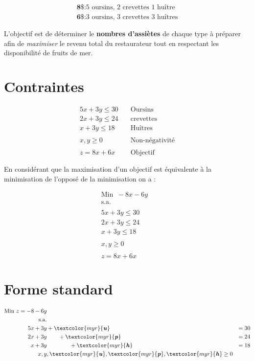 \documentclass{report}
\begin{document}
\begin{multicols*}{3}
\begin{align*}
    \textbf{8\$} \colon \text{5 oursins, 2 crevettes 1 huître}  \\
    \textbf{6\$} \colon \text{3 oursins, 3 crevettes 3 huîtres}   
\end{align*}

L'objectif est de déterminer le \textbf{nombres d'assiètes} de chaque 
type à préparer afin de \textit{maximiser} 
le revenu total du restaurateur tout en 
respectant les disponibilité de fruits de mer. 


\section{Contraintes}
\begin{align*}
    5x + 3y \leq 30& \quad \text{Oursins} \\
    2x + 3y \leq 24& \quad \text{crevettes} \\ 
    x  + 3y \leq 18& \quad \text{Huîtres}
    \\
    \\ 
    x, y \geq 0& \quad \text{Non-négativité}
    \\ 
    \\
    z = 8x + 6x& \quad \text{Objectif}
\end{align*}




En considérant que la maximisation d'un objectif est 
équivalente à la minimisation de l'opposé de la minimisation on a :


\begin{align*}
    \text{Min} \;\; -8x  -6y& \\
    \text{s.a.}
    \\
    \\
    5x + 3y \leq 30& \\
    2x + 3y \leq 24& \\
    x  + 3y \leq 18& 
    \\
    \\ 
    x, y \geq 0& 
    \\ 
    \\
    z = 8x + 6x& 
\end{align*}


\section{Forme standard}

\begin{align*}
    \text{Min } z = -8 -6y \\ 
    \text{s.a.} 
    \\
    5x + 3y& + \textcolor{myr}{\textbf{\textit{u}}}   &= 30 \\
    2x + 3y& \quad\quad + \textcolor{myr}{\textbf{\textit{p}}}   &= 24\\
     x + 3y& \quad\quad\quad\quad + \textcolor{myr}{\textbf{\textit{h}}}   &= 18 \\
     x, y&,  
     \textcolor{myr}{\textbf{\textit{u}}}, 
     \textcolor{myr}{\textbf{\textit{p}}},
     \textcolor{myr}{\textbf{\textit{h}}} \geq 0
\end{align*}


\end{multicols*}
\end{document}
